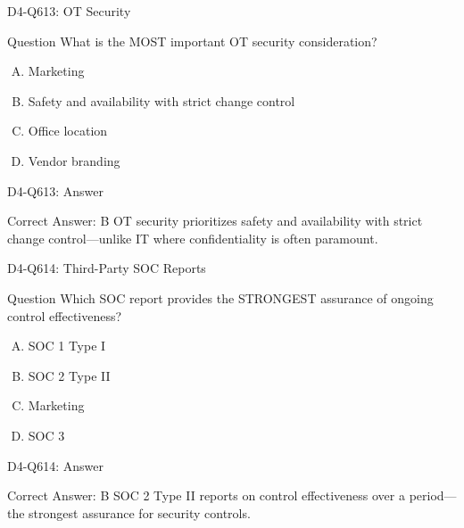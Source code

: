 \documentclass{beamer}
\begin{document}
	\begin{frame}{D4-Q613: OT Security}
		\begin{block}{Question}
			What is the MOST important OT security consideration?
		\end{block}
		\begin{enumerate}[(A)]
			\item Marketing
			\item Safety and availability with strict change control
			\item Office location
			\item Vendor branding
		\end{enumerate}
	\end{frame}
	\begin{frame}{D4-Q613: Answer}
		\begin{block}{Correct Answer: B}
			OT security prioritizes safety and availability with strict change control—unlike IT where confidentiality is often paramount.
		\end{block}
	\end{frame}
	
	\begin{frame}{D4-Q614: Third-Party SOC Reports}
		\begin{block}{Question}
			Which SOC report provides the STRONGEST assurance of ongoing control effectiveness?
		\end{block}
		\begin{enumerate}[(A)]
			\item SOC 1 Type I
			\item SOC 2 Type II
			\item Marketing
			\item SOC 3
		\end{enumerate}
	\end{frame}
	\begin{frame}{D4-Q614: Answer}
		\begin{block}{Correct Answer: B}
			SOC 2 Type II reports on control effectiveness over a period—the strongest assurance for security controls.
		\end{block}
	\end{frame}
	
\end{document}
